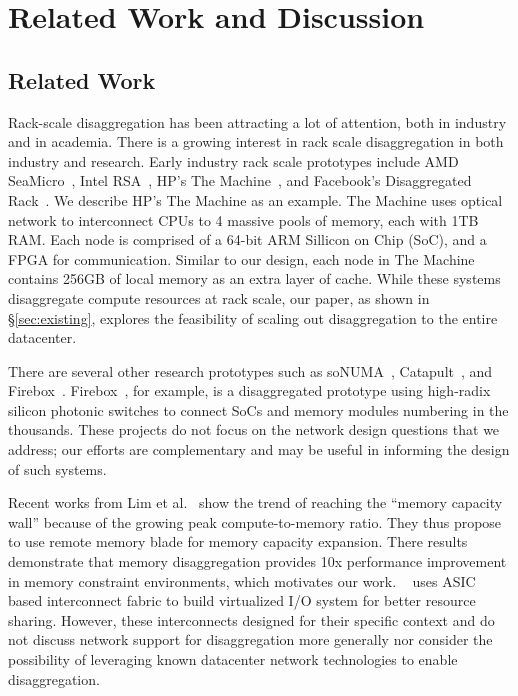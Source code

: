 \section{Related Work and Discussion}
\label{sec:discussion}

\subsection{Related Work}
 Rack-scale disaggregation has been attracting a lot of attention, both in industry and in academia. There is a growing interest in rack scale disaggregation in both industry and research.
Early industry rack scale prototypes include AMD SeaMicro~\cite{seamicro}, Intel RSA~\cite{rsa}, HP's The Machine~\cite{hptm}, and Facebook's Disaggregated Rack~\cite{fdr}.
We describe HP's The Machine as an example. 
The Machine uses optical network to interconnect CPUs to 4 massive pools of memory, each with 1TB RAM.
Each node is comprised of a 64-bit ARM Sillicon on Chip (SoC), and a FPGA for communication. 
Similar to our design, each node in The Machine contains 256GB of local memory as an extra layer of cache.
While these systems disaggregate compute resources at rack scale, our paper, as shown in \S \ref{sec:existing}, explores the feasibility of scaling out disaggregation to the entire datacenter.


There are several other research prototypes such as soNUMA~\cite{sonuma}, Catapult~\cite{catapult}, and Firebox~\cite{firebox}.
Firebox~\cite{firebox}, for example, is a disaggregated prototype using high-radix silicon photonic switches to connect SoCs and memory modules numbering in the thousands.
These projects do not focus on the network design questions that we address; our efforts are complementary and may be useful in informing the design of such systems.


Recent works from Lim et al.~\cite{ddcHwDesign1, ddcHwDesign2} show the trend of reaching the ``memory capacity wall'' because of the growing peak compute-to-memory ratio. 
They thus propose to use remote memory blade for memory capacity expansion. 
There results demonstrate that memory disaggregation provides 10x performance improvement in memory constraint environments, which motivates our work.
~\cite{ddcHwDesign3} uses ASIC based interconnect fabric to build virtualized I/O system for better resource sharing. 
However, these interconnects designed for their specific context and do not discuss network support for disaggregation more generally nor consider the possibility of leveraging known datacenter network technologies to enable disaggregation.


